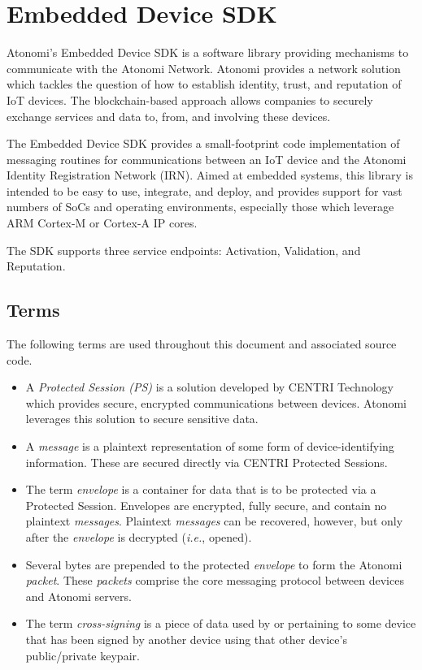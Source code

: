 \chapter{Embedded Device SDK}

Atonomi's Embedded Device SDK is a software library providing mechanisms to communicate
with the Atonomi Network. Atonomi provides a network solution which tackles
the question of how to establish identity, trust, and reputation of IoT devices.
The blockchain-based approach allows companies to securely exchange services
and data to, from, and involving these devices.

The Embedded Device SDK provides a small-footprint code implementation of
messaging routines for communications between an IoT device and the Atonomi
Identity Registration Network (IRN). Aimed at embedded systems, this library
is intended to be easy to use, integrate, and deploy, and provides support
for vast numbers of SoCs and operating environments, especially those which
leverage ARM Cortex-M or Cortex-A IP cores.

The SDK supports three service endpoints: Activation, Validation, and Reputation.


\section{Terms}
The following terms are used throughout this document and associated source code.

\begin{itemize}
	\item A \textit{Protected Session (PS)} is a solution developed by CENTRI
		Technology which provides secure, encrypted communications between
		devices. Atonomi leverages this solution to secure sensitive
		data.
	\item A \textit{message} is a plaintext representation of some form of
		device-identifying information. These are secured directly via
		CENTRI Protected Sessions.
	\item The term \textit{envelope} is a container for data that is to be
		protected via a Protected Session. Envelopes are encrypted, fully
		secure, and contain no plaintext \textit{messages}. Plaintext
		\textit{messages} can be recovered, however, but only after
		the \textit{envelope} is decrypted (\textit{i.e.}, opened).
	\item Several bytes are prepended to the protected \textit{envelope} to
		form the Atonomi \textit{packet}. These \textit{packets} comprise
		the core messaging protocol between devices and Atonomi servers.
	\item The term \textit{cross-signing} is a piece of data used by or
		pertaining to some device that has been signed by another device
		using that other device's public/private keypair.
\end{itemize}



